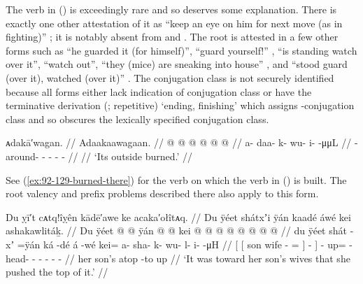 The verb in (\lastx) is exceedingly rare and so deserves some explanation.
There is exactly one other attestation of it as  “keep an eye on him for next move (as in fighting)” \parencite[02/236]{leer:1973}; it is notably absent from \cite{leer:1976} and \cite{story-naish:1973}.
The root is attested in a few other forms such as  “he guarded it (for himself)”,  “guard yourself!” \parencite[both][19]{leer:1963},  “is standing watch over it”,  “watch out”,  “they (mice) are sneaking into house” \parencite[both][02/236]{leer:1973}, and  “stood guard (over it), watched (over it)” \parencite[133]{leer:1976}.
The conjugation class is not securely identified because all forms either lack indication of conjugation class or have the terminative derivation  (;  repetitive) ‘ending, finishing’ which assigns -conjugation class and so obscures the lexically specified conjugation class.

\ex\label{ex:92-132-outside-burned}%
%
\begingl
	\glpreamble	ᴀdakā′wagan. //
	\glpreamble	Adaakaawagaan. //
	\gla	{} @ {} @ {} @ {} @ {} @ {} @ {} //
	\glb	a- daa- k- wu- i-  -μμL //
	\glc	{}- around- - - -  - //
	\gld	{} {} {} {} {} {} {} //
	\glft	‘Its outside burned.’
		//
\endgl
\xe

See (\ref{ex:92-129-burned-there}) for the verb  on which the verb in (\lastx) is built.
The root valency and  prefix problems described there also apply to this form.

\ex\label{ex:92-133-push-it-at-them}%
%
\begingl
	\glpreamble	Du ỵī′t cᴀtq!îỵên kādē′awe ke acaka′ołîtᴀq. //
	\glpreamble	Du ÿéet shátxʼi ÿán kaadé áwé kei ashakawlitáḵ. //
	\gla	{} {} Du ÿéet  @ {} @ \•ÿán {}  @ {} {}
		 @ {}
		kei @  @ {} @ {} @ {} @ {} @ {} @ {} @ {} //
	\glb	{} {} du ÿéet shát -xʼ =ÿán {} ká -dé {}
		á -wé
		kei= a- sha- k- wu- l- i-  -μH //
	\glc	{}[ {}[  son wife - = {}]
			 - {}]
		 -
		up= - head- - - - -
			 - //
	\gld	{} {} her son’s  {} {} {} atop -to {}
		 {}
		up  {} {} {} {} {} {} {} //
	\glft	‘It was toward her son’s wives that she pushed the top of it.’
		//
\endgl
\xe

